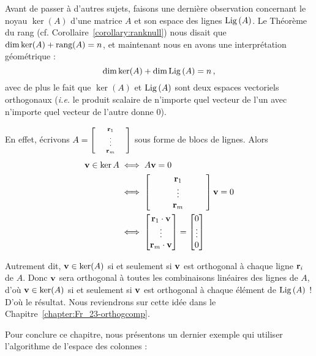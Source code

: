 \begin{remark}\label{NullperpRow}

Avant de passer \`a d'autres sujets, faisons une dernière observation concernant le noyau $\ker(A)$ d'une matrice $A$ et son espace des lignes $\operatorname{Lig\,}(A)$. 
Le Théorème du rang (cf. Corollaire~\ref{corollary:ranknull}) nous disait que $\dim \ker(A)  + \textrm{rang}(A) = n$, et maintenant nous en avons une interprétation géométrique :
$$
\dim \ker(A)  + \dim \operatorname{Lig\,}(A) = n\,,
$$
avec de plus le fait que $\ker(A)$ et $\operatorname{Lig\,}(A)$ sont deux espaces vectoriels orthogonaux (\textit{i.e.} le produit scalaire de n'importe quel vecteur de l'un avec n'importe quel vecteur de l'autre donne $0$).

En effet, \'ecrivons $A=\scriptsize\bmatrix ~&\rr_1&~\\&\vdots \\&\rr_m\endbmatrix $ sous forme de blocs de lignes. Alors
\begin{align*} \vv\in \ker A &\iff  A\vv=0\\
&\iff \bmatrix ~&~&\rr_1&~&~\\&&\vdots \\&&\rr_m\endbmatrix  \vv=0\\
&\iff \bmatrix \rr_1\cdot \vv\\\vdots \\\rr_m\cdot \vv\endbmatrix = \bmatrix 0\\\vdots \\0\endbmatrix 
\end{align*}

Autrement dit, $\mathbf{v} \in \ker(A)$ si et seulement si $\mathbf{v}$ est orthogonal à chaque ligne $\mathbf{r}_i$ de $A$. Donc $\mathbf{v}$ sera orthogonal à toutes les combinaisons linéaires des lignes de $A$, d'o\`u $\mathbf{v} \in \ker(A)$ si et seulement si $\mathbf{v}$ est orthogonal à chaque élément de $\operatorname{Lig\,}(A)$ ! D'où le résultat. Nous reviendrons sur cette idée dans le Chapitre~\ref{chapter:Fr_23-orthogcomp}.\\
\end{remark}

Pour conclure ce chapitre, nous présentons un dernier exemple qui utiliser l'algorithme de l'espace des colonnes :



